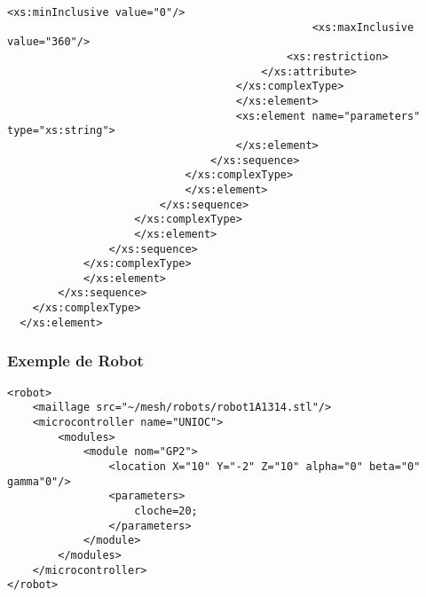 \begin{changemargin}{-1cm}{-1cm}
\begin{lstlisting}[caption=Description du Robot, label=descbot]
                                                <xs:minInclusive value="0"/>
                                                <xs:maxInclusive value="360"/>
                                            <xs:restriction>
                                        </xs:attribute>
                                    </xs:complexType>
                                    </xs:element>
                                    <xs:element name="parameters" type="xs:string">
                                    </xs:element>
                                </xs:sequence>
                            </xs:complexType>
                            </xs:element>
                        </xs:sequence>
                    </xs:complexType>
                    </xs:element>
                </xs:sequence>
            </xs:complexType>
            </xs:element>
        </xs:sequence>
    </xs:complexType>
  </xs:element>
  \end{lstlisting}
\end{changemargin}

\subsubsection{Exemple de Robot}
\begin{lstlisting}[caption=Exemple de Robot, label=exrobot]
<robot>
	<maillage src="~/mesh/robots/robot1A1314.stl"/>
	<microcontroller name="UNIOC">
		<modules>
			<module nom="GP2">
				<location X="10" Y="-2" Z="10" alpha="0" beta="0" gamma"0"/>
				<parameters>
					cloche=20;
				</parameters>
			</module>
		</modules>
	</microcontroller>
</robot>
\end{lstlisting}
  
\clearpage
